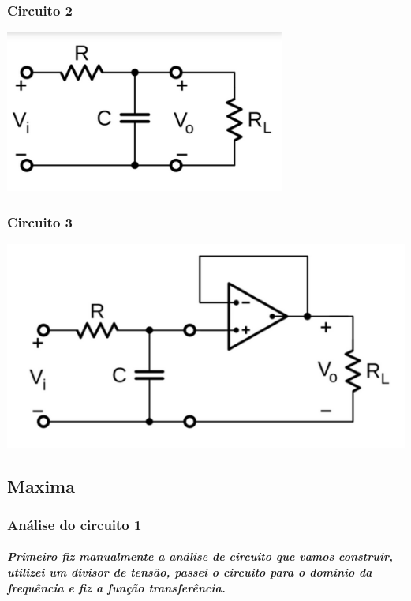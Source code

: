 \documentclass[12pt,twoside, a4paper, twocolumn]{article}
\begin{document}
\subsubsection{Circuito 2}
\begin{adjustbox}{scale=0.6}
    \includegraphics{circuito2.png}
\end{adjustbox}




\subsubsection{Circuito 3}
\begin{adjustbox}{scale=0.6}
    \includegraphics{circuito3.png}
\end{adjustbox}


\subparagraph*{}


\subsection{Maxima}


\subsubsection{Análise do circuito 1}


\subparagraph*{Primeiro fiz manualmente a análise de circuito que vamos construir, utilizei um divisor de tensão, passei o circuito para o domínio da frequência e fiz a função transferência.}
\subparagraph*{}
\end{document}
